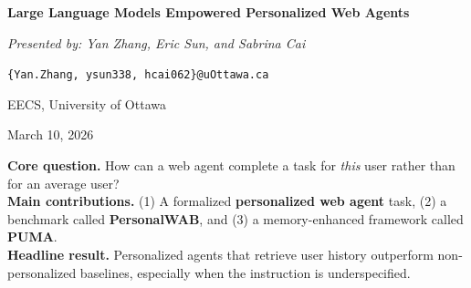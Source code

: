\documentclass{article}
\begin{document}
\small

\begin{center}
	{\LARGE\bfseries Large Language Models Empowered
Personalized Web Agents\par}
	\vspace{0.35em}
	{\normalsize\emph{Presented by: Yan Zhang, Eric Sun, and Sabrina Cai}\par}
	\vspace{0.2em}
	{\small \texttt{\{Yan.Zhang, ysun338, hcai062\}@uOttawa.ca}\par}
	{\small EECS, University of Ottawa\par}
	\vspace{0.2em}
	{\small March 10, 2026\par}
\end{center}

\vspace{0.4em}

\begin{tcolorbox}[colback=blue!4,colframe=blue!45!black,title=Paper at a Glance]
\textbf{Core question.} How can a web agent complete a task for \emph{this} user rather than for an average user?\\
\textbf{Main contributions.} (1) A formalized \textbf{personalized web agent} task, (2) a benchmark called \textbf{PersonalWAB}, and (3) a memory-enhanced framework called \textbf{PUMA}.\\
\textbf{Headline result.} Personalized agents that retrieve user history outperform non-personalized baselines, especially when the instruction is underspecified.
\end{tcolorbox}
\end{document}
